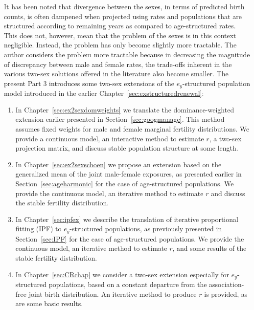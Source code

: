 \FloatBarrier
\label{Chapter:ex2sex}
It has been noted that divergence between the sexes, in terms of predicted birth
counts, is often dampened when projected using rates and populations that are
structured according to remaining years as compared to age-structured rates.
This does not, however, mean that the problem of the sexes is in this context
 negligible. Instead, the problem has
only become slightly more tractable. The author considers the problem more
tractable because in decreasing the magnitude of discrepancy between male and female
rates, the trade-offs inherent in the various two-sex solutions offered in the
literature also become smaller. The present Part 3 introduces some two-sex
extensions of the $e_y$-structured population model introduced in the earlier
Chapter~\ref{sec:exstructuredrenewal}:
\begin{enumerate}
  \item In Chapter~\ref{sec:ex2sexdomweights} we
  translate the dominance-weighted extension earlier presented in
  Section~\ref{sec:googmanage}. This method assumes fixed weights for male and
  female marginal fertility distributions. We provide a continuous model, an
  interactive method to estimate $r$, a two-sex projection matrix, and discuss
  stable population structure at some length.
  \item In Chapter~\ref{sec:ex2sexschoen} we propose an extension based on the
  generalized mean of the joint male-female exposures, as presented earlier in
  Section~\ref{sec:ageharmonic} for the case of age-structured populations. We
  provide the continuous model, an iterative method to estimate $r$ and discuss
  the stable fertility distribution.
  \item In Chapter~\ref{sec:ipfex} we describe the translation of iterative
  proportional fitting (IPF) to $e_y$-structured populations, as previously
  presented in Section~\ref{sec:IPF} for the case of age-structured populations.
  We provide the continuous model, an iterative method to estimate $r$, and some
  results of the stable fertility distribution.
  \item In Chapter~\ref{sec:CRchap} we consider a two-sex extension
  especially for $e_y$-structured populations, based on a constant departure
  from the association-free joint birth distribution. An iterative method to
  produce $r$ is provided, as are some basic results.
\end{enumerate}